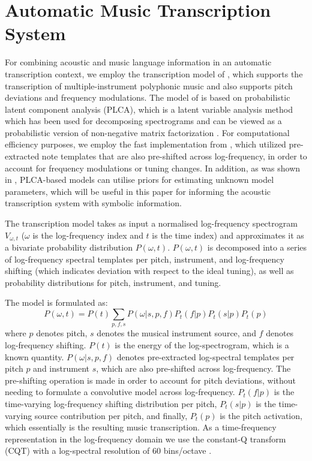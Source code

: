 \section{Automatic Music Transcription System} \label{sec:transcription}


For combining acoustic and music language information in an automatic transcription context, we employ the transcription model of \cite{Benetos2012}, which supports the transcription of multiple-instrument polyphonic music and also supports pitch deviations and frequency modulations. The model of \cite{Benetos2012} is based on probabilistic latent component analysis (PLCA), which is a latent variable analysis method which has been used for decomposing spectrograms \cite{Shashanka2008} and can be viewed as a probabilistic version of non-negative matrix factorization \cite{Li1999}. For computational efficiency purposes, we employ the fast implementation from \cite{Benetos2013}, which utilized pre-extracted note templates that are also pre-shifted across log-frequency, in order to account for frequency modulations or tuning changes. In addition, as was shown in \cite{Smaragdis2009}, PLCA-based models can utilise priors for estimating unknown model parameters, which will be useful in this paper for informing the 
acoustic transcription system with symbolic information.

The transcription model takes as input a normalised log-frequency spectrogram $V_{\omega,t}$ ($\omega$ is the log-frequency index and $t$ is the time index) and approximates it as a bivariate probability distribution $P(\omega,t)$. $P(\omega,t)$ is decomposed into a series of log-frequency spectral templates per pitch, instrument, and log-frequency shifting (which indicates deviation with respect to the ideal tuning), as well as probability distributions for pitch, instrument, and tuning. 

The model is formulated as:
\begin{equation}
P(\omega,t) = P(t)\sum_{p,f,s}P(\omega|s,p,f)P_{t}(f|p)P_{t}(s|p)P_{t}(p) \label{eq:Model}
\end{equation} 
where $p$ denotes pitch, $s$ denotes the musical instrument source, and $f$ denotes log-frequency shifting. $P(t)$ is the energy of the log-spectrogram, which is a known quantity. $P(\omega|s,p,f)$ denotes pre-extracted log-spectral templates per pitch $p$ and instrument $s$, which are also pre-shifted across log-frequency. The pre-shifting operation is made in order to account for pitch deviations, without needing to formulate a convolutive model across log-frequency. $P_{t}(f|p)$ is the time-varying log-frequency shifting distribution per pitch, $P_{t}(s|p)$ is the time-varying source contribution per pitch, and finally, $P_{t}(p)$ is the pitch activation, which essentially is the resulting music transcription. As a time-frequency representation in the log-frequency domain we use the constant-Q transform (CQT) with a log-spectral resolution of 60 bins/octave \cite{Schoerkhuber10}.

